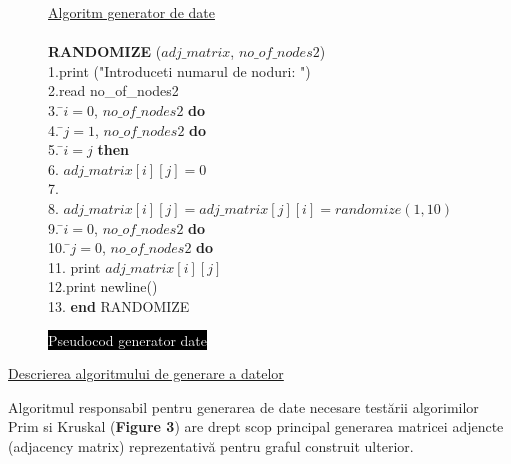 \documentclass[14pt]{article}
\begin{document}
\vspace{5mm}
\begin{figure}[h]
\begin{center}
\begin{tabbing}

\large{\underline{Algoritm generator de date}}\\

\vspace{15mm}\\
\textbf{RANDOMIZE} ($adj\_matrix$, $no\_of\_nodes2$)\\
1.\indent print ("Introduceti numarul de noduri: ")\\
2.\indent read no\_of\_nodes2\\
3.  \=$i = 0$, $no\_of\_nodes2$ {\bf do} \\
4.        \=$j = 1$, $no\_of\_nodes2$ {\bf do} \\
5. \indent            {} \=$i = j$  {\bf then} \\
6. \indent               \>           \> $adj\_matrix[i][j] = 0$ \\
7. \indent            {} \\
8. \indent               \>           \> $adj\_matrix[ i ][ j ] = adj\_matrix[ j ][ i ] = randomize (1,10)$ \\
9.  \=$i = 0$, $no\_of\_nodes2$ {\bf do} \\
10.      \=$j = 0$, $no\_of\_nodes2$ {\bf do} \\
11.\indent          \>           print $adj\_matrix[i][j]$\\
12.\indent print newline()\\
13. \textbf{end} RANDOMIZE

\vspace{20mm}

\end{tabbing}
\caption{\colorbox{black}{\textcolor{white}{Pseudocod generator date}}}
\end{center}
\end{figure}

\vspace{3mm}

\large\underline{{Descrierea algoritmului de generare a datelor}}
\vspace{3mm}

Algoritmul responsabil pentru generarea de date necesare test\u{a}rii algorimilor Prim si Kruskal (\textbf{Figure 3}) are drept scop principal generarea matricei adjencte (adjacency matrix) reprezentativ\u{a} pentru graful construit ulterior.\\
\end{document}
